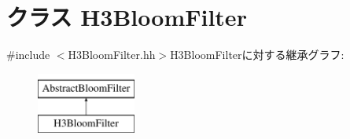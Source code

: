 \hypertarget{classH3BloomFilter}{
\section{クラス H3BloomFilter}
\label{classH3BloomFilter}
}


{\ttfamily \#include $<$H3BloomFilter.hh$>$}H3BloomFilterに対する継承グラフ:\begin{figure}[H]
\begin{center}
\leavevmode
\includegraphics[height=2cm]{classH3BloomFilter}
\end{center}
\end{figure}
